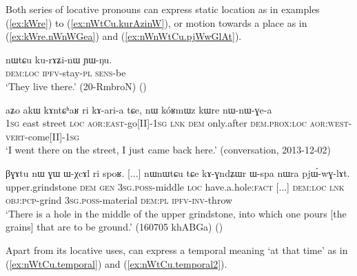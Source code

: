 Both series of locative pronouns can express static location as in examples (\ref{ex:kWre}) to  (\ref{ex:nWtCu.kurAzinW}), or motion towards a place as in (\ref{ex:kWre.nWnWGea}) and (\ref{ex:nWnWtCu.pjWwGlAt}).

\begin{exe}
\ex \label{ex:nWtCu.kurAzinW}
 \gll nɯtɕu ku-rɤʑi-nɯ ɲɯ-ŋu. \\
 \textsc{dem}:\textsc{loc} \textsc{ipfv}-stay-\textsc{pl} \textsc{sens}-be \\
 \glt `They live there.' (20-RmbroN) ()
\end{exe}

\begin{exe}
\ex \label{ex:kWre.nWnWGea}
 \gll aʑo akɯ kɤntɕʰaʁ ri kɤ-ari-a tɕe, nɯ kóʁmɯz kɯre nɯ-nɯ-ɣe-a \\
 \textsc{1sg} east street \textsc{loc} \textsc{aor}:\textsc{east}-go[II]-\textsc{1sg} \textsc{lnk} \textsc{dem} only.after \textsc{dem}.\textsc{prox}:\textsc{loc} \textsc{aor}:\textsc{west}-\textsc{vert}-come[II]-\textsc{1sg} \\
\glt `I went there on the street, I just came back here.' (conversation, 2013-12-02)
\end{exe}

\begin{exe}
\ex \label{ex:nWnWtCu.pjWwGlAt}
 \gll βɣɤtu nɯ ɣɯ ɯ-χcɤl ri spoʁ. [...] nɯnɯtɕu tɕe kɤ-ɣndʑɯr ɯ-spa nɯra pjɯ́-wɣ-lɤt. \\
upper.grindstone \textsc{dem} \textsc{gen} \textsc{3sg}.\textsc{poss}-middle \textsc{loc} have.a.hole:\textsc{fact}  [...] \textsc{dem}:\textsc{loc} \textsc{lnk} \textsc{obj}:\textsc{pcp}-grind \textsc{3sg}.\textsc{poss}-material \textsc{dem}:\textsc{pl} \textsc{ipfv}-\textsc{inv}-throw \\
\glt `There is a hole in the middle of the upper grindstone, into which one pours [the grains] that are to be ground.' (160705 khABGa)
()
\end{exe}

Apart from its locative uses,  can express a temporal meaning `at that time' as in (\ref{ex:nWtCu.temporal}) and (\ref{ex:nWtCu.temporal2}).

